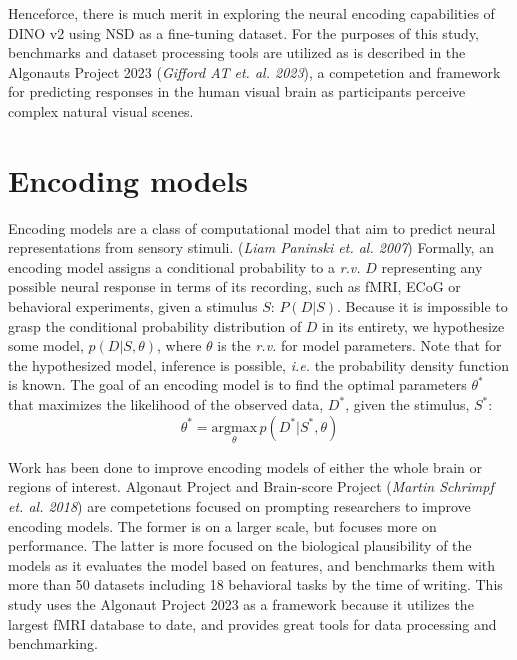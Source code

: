 \documentclass[11pt]{article}
\begin{document}
Henceforce, there is much merit in exploring the neural encoding capabilities of DINO v2 using NSD as a fine-tuning dataset. For the purposes of this study, benchmarks and dataset processing tools are utilized as is described in the Algonauts Project 2023 (\emph{Gifford AT et. al. 2023}), a competetion and framework for predicting responses in the human visual brain as participants perceive complex natural visual scenes.

\section{Encoding models}
\label{sec:orgc639956}
Encoding models are a class of computational model that aim to predict neural representations from sensory stimuli. (\emph{Liam Paninski et. al. 2007}) Formally, an encoding model assigns a conditional probability to a \emph{r.v.} \(D\) representing any possible neural response in terms of its recording, such as fMRI, ECoG or behavioral experiments, given a stimulus \(S\): \(P(D|S)\). Because it is impossible to grasp the conditional probability distribution of \(D\) in its entirety, we hypothesize some model, \(p(D|S, \theta)\), where \(\theta\) is the \emph{r.v.} for model parameters. Note that for the hypothesized model, inference is possible, \emph{i.e.} the probability density function is known. The goal of an encoding model is to find the optimal parameters \(\theta^*\) that maximizes the likelihood of the observed data, \(D^*\), given the stimulus, \(S^*\):
\begin{equation}
\theta^* = \underset{\theta}{\mathrm{argmax}}\, p(D^*|S^*, \theta)
\end{equation}

Work has been done to improve encoding models of either the whole brain or regions of interest. Algonaut Project and Brain-score Project (\emph{Martin Schrimpf et. al. 2018}) are competetions focused on prompting researchers to improve encoding models. The former is on a larger scale, but focuses more on performance. The latter is more focused on the biological plausibility of the models as it evaluates the model based on features, and benchmarks them with more than 50 datasets including 18 behavioral tasks by the time of writing. This study uses the Algonaut Project 2023 as a framework because it utilizes the largest fMRI database to date, and provides great tools for data processing and benchmarking.
\end{document}
